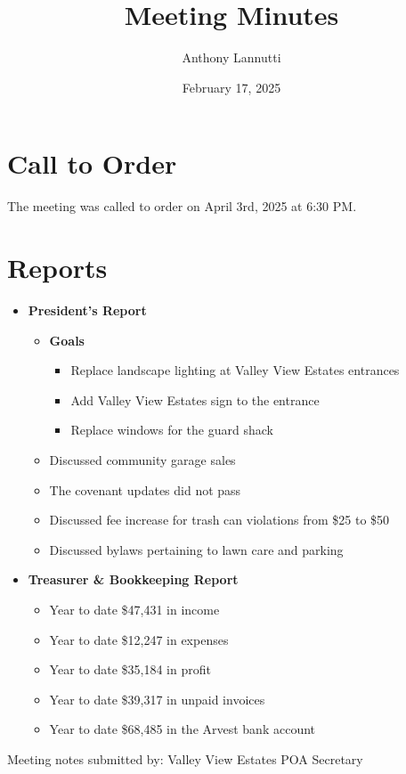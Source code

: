 \documentclass[12pt,a4paper]{article}
\author{Anthony Lannutti}
\date{February 17, 2025}
\title{Meeting Minutes}
\begin{document}
\section*{Call to Order}
\begin{flushleft}
The meeting was called to order on April 3rd, 2025 at 6:30 PM\@.
\end{flushleft}


\section*{Reports}
\begin{itemize}
  \item \textbf{President's Report}
  \begin{itemize}
  \item \textbf{Goals}
    \begin{itemize}
    \item Replace landscape lighting at Valley View Estates entrances
    \item Add Valley View Estates sign to the entrance
    \item Replace windows for the guard shack
    \end{itemize}
  \item Discussed community garage sales
  \item The covenant updates did not pass
  \item Discussed fee increase for trash can violations from \$25 to \$50
  \item Discussed bylaws pertaining to lawn care and parking
  \end{itemize}
  \item \textbf{Treasurer \& Bookkeeping Report}
  \begin{itemize}
  \item Year to date \$47,431 in income
  \item Year to date \$12,247 in expenses
  \item Year to date \$35,184 in profit
  \item Year to date \$39,317 in unpaid invoices
  \item Year to date \$68,485 in the Arvest bank account
  \end{itemize}
\end{itemize}

\begin{flushleft}
Meeting notes submitted by:\break{}
\@author\break{}
Valley View Estates POA Secretary
\end{flushleft}
\end{document}
